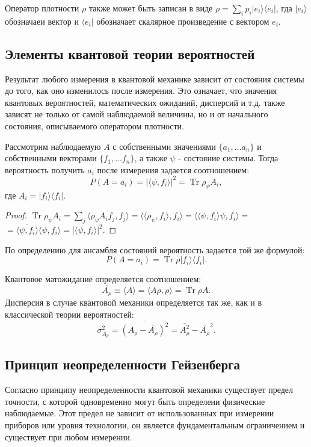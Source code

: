 \documentclass[11pt]{article}
\DeclareMathOperator{\Tr}{Tr}
\begin{document}
Оператор плотности $\rho$ также может быть записан в виде $\rho = \sum_i p_i|e_i\rangle\langle e_i|$, гда $|e_i\rangle$ обозначаеи вектор и $\langle e_i|$ обозначает скалярное произведение с вектором $e_i$. 

\subsection{Элементы квантовой теории вероятностей}
Результат любого измерения в квантовой механике зависит от состояния системы до того, как оно изменилось после измерения. Это означает, что значения квантовых вероятностей, математических ожиданий, дисперсий и т.д. также зависят не только от самой наблюдаемой величины, но и от начального состояния, описываемого оператором плотности.

Рассмотрим наблюдаемую $A$ с собственными значениями $\{a_1,\ldots a_n\}$ и собственными векторами $\{f_1,\ldots f_n\}$, а также $\psi$ - состояние системы. Тогда вероятность получить $a_i$ после измерения задается соотношением:
\[
P(A = a_i) = |\langle\psi, f_i\rangle|^2 = \Tr \rho_\psi A_i,
\]
где $A_i = |f_i\rangle \langle f_i|$.
\begin{proof}
$\Tr \rho_\psi A_i = \sum_j \langle\rho_\psi A_if_j, f_j\rangle = \langle \langle\rho_\psi, f_i\rangle, f_i\rangle = \langle \langle \psi, f_i\rangle\psi, f_i\rangle = $\\
$= \overline{\langle\psi, f_i\rangle} \langle\psi, f_i\rangle = |\langle\psi, f_i\rangle|^2.$
\end{proof}
По определению для ансамбля состояний вероятность задается той же формулой:
\[
P(A = a_i) = \Tr \rho |f_i\rangle \langle f_i|.
\]

Квантовое матожидание определяется соотношением:
\[
\overline{A_\rho} \equiv \langle A\rangle = \langle A\rho, \rho\rangle = \Tr\rho A.
\]
Дисперсия в случае квантовой механики определяется так же, как и в классической теории вероятностей:
\[
\sigma^2_{A_\rho} = \overline{\left(A_\rho - \overline{A_\rho}\right)^2} = \overline{A^2_\rho} - \overline{A_\rho}^2.
\] 

\subsection{Принцип неопределенности Гейзенберга}
Согласно принципу неопределенности квантовой механики существует предел точности, с которой одновременно могут быть определени физические наблюдаемые. Этот предел не зависит от использованных при измерении приборов или уровня технологии, он является фундаментальным ограничением и существует при любом измерении.
\end{document}
